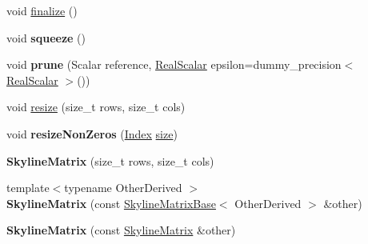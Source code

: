 \begin{DoxyCompactItemize}
\item 
void \hyperlink{class_eigen_1_1_skyline_matrix_a1269310d041fb3ca2a980644f3cfe5a2}{finalize} ()
\item 
\mbox{\label{class_eigen_1_1_skyline_matrix_a96b5819fc711164e746450262dae8693}} 
void {\bfseries squeeze} ()
\item 
\mbox{\label{class_eigen_1_1_skyline_matrix_afda234e34b8312fd2bf93fc4f6935cb3}} 
void {\bfseries prune} (Scalar reference, \hyperlink{class_eigen_1_1_skyline_matrix_base_a24c532ab7e339b956a637a4a968e1565}{Real\+Scalar} epsilon=dummy\+\_\+precision$<$ \hyperlink{class_eigen_1_1_skyline_matrix_base_a24c532ab7e339b956a637a4a968e1565}{Real\+Scalar} $>$())
\item 
void \hyperlink{class_eigen_1_1_skyline_matrix_a918eed5cc583f6d402f0db60c5c5ad52}{resize} (size\+\_\+t rows, size\+\_\+t cols)
\item 
\mbox{\label{class_eigen_1_1_skyline_matrix_a050a0ba5d47a1373a8ed9e1f7d02388e}} 
void {\bfseries resize\+Non\+Zeros} (\hyperlink{group___core___module_a554f30542cc2316add4b1ea0a492ff02}{Index} \hyperlink{class_eigen_1_1_skyline_matrix_base_a635234baea6bd59f97e6bd219adbdb64}{size})
\item 
\mbox{\label{class_eigen_1_1_skyline_matrix_a5615b6d198de88f00219877fbc4c9304}} 
{\bfseries Skyline\+Matrix} (size\+\_\+t rows, size\+\_\+t cols)
\item 
\mbox{\label{class_eigen_1_1_skyline_matrix_a8dbe4249614b89be421470e78592ce5b}} 
{\footnotesize template$<$typename Other\+Derived $>$ }\\{\bfseries Skyline\+Matrix} (const \hyperlink{class_eigen_1_1_skyline_matrix_base}{Skyline\+Matrix\+Base}$<$ Other\+Derived $>$ \&other)
\item 
\mbox{\label{class_eigen_1_1_skyline_matrix_af121abd994f8cb8a8b2c71eeaa843237}} 
{\bfseries Skyline\+Matrix} (const \hyperlink{class_eigen_1_1_skyline_matrix}{Skyline\+Matrix} \&other)
\item 
\mbox{\label{class_eigen_1_1_skyline_matrix_ab7c63da758aec8c76c3702c09b5f76a9}} 

\end{DoxyCompactItemize}
